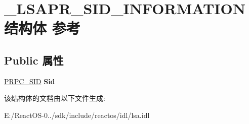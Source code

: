 \hypertarget{struct___l_s_a_p_r___s_i_d___i_n_f_o_r_m_a_t_i_o_n}{}\section{\+\_\+\+L\+S\+A\+P\+R\+\_\+\+S\+I\+D\+\_\+\+I\+N\+F\+O\+R\+M\+A\+T\+I\+O\+N结构体 参考}
\label{struct___l_s_a_p_r___s_i_d___i_n_f_o_r_m_a_t_i_o_n}
\subsection*{Public 属性}
\begin{DoxyCompactItemize}
\item 
\mbox{\label{struct___l_s_a_p_r___s_i_d___i_n_f_o_r_m_a_t_i_o_n_affd05c34bdc7f0869d4f4b0af912f0bd}} 
\hyperlink{struct___r_p_c___s_i_d}{P\+R\+P\+C\+\_\+\+S\+ID} {\bfseries Sid}
\end{DoxyCompactItemize}


该结构体的文档由以下文件生成\+:\begin{DoxyCompactItemize}
\item 
E\+:/\+React\+O\+S-\/0../sdk/include/reactos/idl/lsa.\+idl\end{DoxyCompactItemize}
